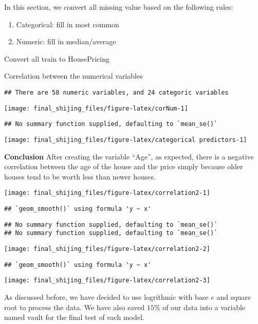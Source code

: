 \documentclass[
]{article}
\begin{document}
In this section, we convert all missing value based on the following
rules:

\begin{enumerate}
\item Categorical: fill in most common
\item Numeric: fill in median/average
\end{enumerate}

Convert all train to HousePricing

Correlation between the numerical variables

\begin{verbatim}
## There are 58 numeric variables, and 24 categoric variables
\end{verbatim}

\texttt{[image: final\_shijing\_files/figure-latex/corNum-1]}

\begin{verbatim}
## No summary function supplied, defaulting to `mean_se()`
\end{verbatim}

\texttt{[image: final\_shijing\_files/figure-latex/categorical predictors-1]}

\textbf{Conclusion} After creating the variable ``Age'', as expected,
there is a negative correlation between the age of the house and the
price simply because older houses tend to be worth less than newer
houses.

\texttt{[image: final\_shijing\_files/figure-latex/correlation2-1]}

\begin{verbatim}
## `geom_smooth()` using formula 'y ~ x'
\end{verbatim}

\begin{verbatim}
## No summary function supplied, defaulting to `mean_se()`
## No summary function supplied, defaulting to `mean_se()`
\end{verbatim}

\texttt{[image: final\_shijing\_files/figure-latex/correlation2-2]}

\begin{verbatim}
## `geom_smooth()` using formula 'y ~ x'
\end{verbatim}

\texttt{[image: final\_shijing\_files/figure-latex/correlation2-3]}

As discussed before, we have decided to use logrithmic with base \(e\)
and square root to process the data. We have also saved \(15\%\) of our
data into a variable named vault for the final test of each model.
\end{document}
